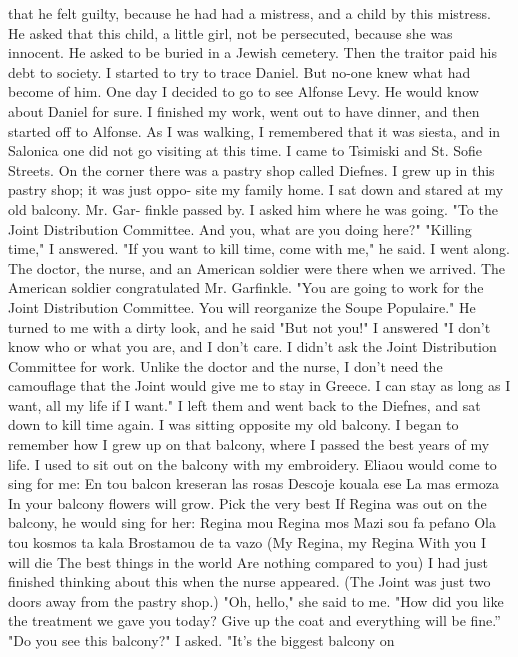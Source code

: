 that he felt guilty, because he had had a mistress, and a child by this 
mistress. He asked that this child, a little girl, not be persecuted, 
because she was innocent. He asked to be buried in a Jewish cemetery. 
Then the traitor paid his debt to society. 
I started to try to trace Daniel. But no-one knew what had become 
of him. One day I decided to go to see Alfonse Levy. He would know 
about Daniel for sure. I finished my work, went out to have dinner, 
and then started off to Alfonse. As I was walking, I remembered that 
it was siesta, and in Salonica one did not go visiting at this time. I 
came to Tsimiski and St. Sofie Streets. On the corner there was a pastry 
shop called Diefnes. I grew up in this pastry shop; it was just oppo-
site my family home. I sat down and stared at my old balcony. Mr. Gar-
finkle passed by. I asked him where he was going. 
"To the Joint Distribution Committee. And you, what are you doing 
here?" 
"Killing time," I answered. 
"If you want to kill time, come with me," he said. I went along. 
The doctor, the nurse, and an American soldier were there when we 
arrived. The American soldier congratulated Mr. Garfinkle. "You are 
going to work for the Joint Distribution Committee. You will reorganize 
the Soupe Populaire." He turned to me with a dirty look, and he said 
"But not you!" 
I answered "I don't know who or what you are, and I don't care. I 
didn't ask the Joint Distribution Committee for work. Unlike the doctor 
and the nurse, I don't need the camouflage that the Joint would give me 
to stay in Greece. I can stay as long as I want, all my life if I want." 
I left them and went back to the Diefnes, and sat down to kill time again. 
I was sitting opposite my old balcony. I began to remember how I 
grew up on that balcony, where I passed the best years of my life. I 
used to sit out on the balcony with my embroidery. Eliaou would come 
to sing for me: 
En tou balcon kreseran las rosas 
Descoje kouala ese 
La mas ermoza 
In your balcony flowers will grow. 
Pick the very best
If Regina was out on the balcony, he would sing for her: 
Regina mou Regina mos 
Mazi sou fa pefano 
Ola tou kosmos ta kala 
Brostamou de ta vazo 
(My Regina, my Regina 
With you I will die 
The best things in the world 
Are nothing compared to you) 
I had just finished thinking about this when the nurse appeared. 
(The Joint was just two doors away from the pastry shop.) 
"Oh, hello," she said to me. "How did you like the treatment we 
gave you today? Give up the coat and everything will be fine.”
"Do you see this balcony?" I asked. "It's the biggest balcony on 
